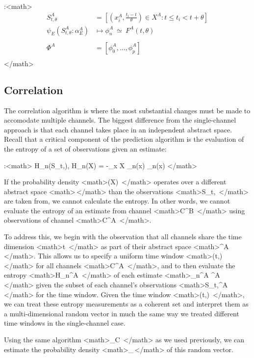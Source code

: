 \documentclass[11pt,twocolumn,titlepage]{article}
\begin{document}
:<math>
\begin{align}
S_{t,\theta}^A &= [ (x_i^A,\frac{t_i - t}{\theta}) \in X^A : t \le t_i < t+\theta ] \\
\psi_E( S_{t,\theta}^A:\alpha_E^A ) &\mapsto \phi_n^A \ \simeq \ F^A(t,\theta)  \\
\\
\Phi^A &= [\phi_0^A,...,\phi_p^A ] \\
\end{align}
</math>

\subsection{Correlation}
The correlation algorithm is where the most substantial changes must be made to accomodate multiple channels.  The biggest difference from the single-channel approach is that each channel takes place in an independent abstract space.  Recall that a critical component of the prediction algorithm is the evaluation of the entropy of a set of observations given an estimate:

:<math>
H_n(S_{t,\theta}), H_n(X) = -\sum_{x \in X} \phi_n(x) \log \phi_n(x)
</math>


If the probability density <math>\phi(X) \,\!</math> operates over a different abstract space <math>\Omega \,\!</math> than the observations <math>S_{t,\theta} \,\!</math> are taken from, we cannot calculate the entropy.  In other words, we cannot evaluate the entropy of an estimate from channel <math>C^B \,\!</math> using observations of channel <math>C^A \,\!</math>.  

To address this, we begin with the observation that all channels share the time dimension <math>t \,\!</math> as part of their abstract space <math>\Omega^A \,\!</math>.  This allows us to specify a uniform time window <math>(t,\theta) \,\!</math> for all channels <math>C^A \in {} \,\!</math>, and to then evaluate the entropy <math>H_n^A \,\!</math> of each estimate <math>\phi_n^A \in \Phi^A \,\!</math> given the subset of each channel's observations <math>S_{t,\theta}^A \,\!</math> for the time window.  Given the time window <math>(t,\theta) \,\!</math>, we can treat these entropy measurements as a coherent set and interpret them as a multi-dimensional random vector in much the same way we treated different time windows in the single-channel case.

Using the same algorithm <math>\psi_C \,\!</math> as we used previously, we can estimate the probability density <math>\phi_\Delta \,\!</math> of this random vector. 
\end{document}
